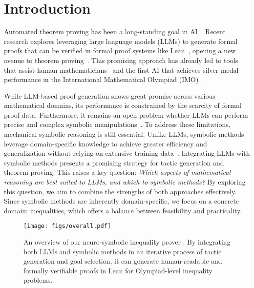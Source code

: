 \section{Introduction}
Automated theorem proving has been a long-standing goal in AI~\citep{newell1956logic}. Recent research explores leveraging large language models (LLMs) to generate formal proofs that can be verified in formal proof systems like Lean~\citep{de2015lean}, opening a new avenue to theorem proving~\citep{li2024survey,yang2024formal}. This promising approach has already led to tools that assist human mathematicians~\citep{song2024towards} and the first AI that achieves silver-medal performance in the International Mathematical Olympiad (IMO)~\citep{alphaproof}.

While LLM-based proof generation shows great promise across various mathematical domains, its performance is constrained by the scarcity of formal proof data. 
Furthermore, it remains an open problem whether LLMs can perform precise and complex symbolic manipulations~\citep{hammond2023large}.
To address these limitations, mechanical symbolic reasoning is still essential. 
Unlike LLMs, symbolic methods leverage domain-specific knowledge to achieve greater efficiency and generalization without relying on extensive training data~\citep{wu2008decision, heule2016solving}. Integrating LLMs with symbolic methods presents a promising strategy for tactic generation and theorem proving. This raises a key question: \emph{Which aspects of mathematical reasoning are best suited to LLMs, and which to symbolic methods?} By exploring this question, we aim to combine the strengths of both approaches effectively. Since symbolic methods are inherently domain-specific, we focus on a concrete domain: inequalities, which offers a balance between feasibility and practicality.

\begin{figure}[t]
\begin{center}
\texttt{[image: figs/overall.pdf]}
\end{center}
\vspace{-0.75em}
\caption{An overview of our neuro-symbolic inequality prover \name. By integrating both LLMs and symbolic methods in an iterative process of tactic generation and goal selection, it can generate human-readable and formally verifiable proofs in Lean for Olympiad-level inequality problems.
} 
\vspace{-1.2em}
\label{fig:overall}
\end{figure}

